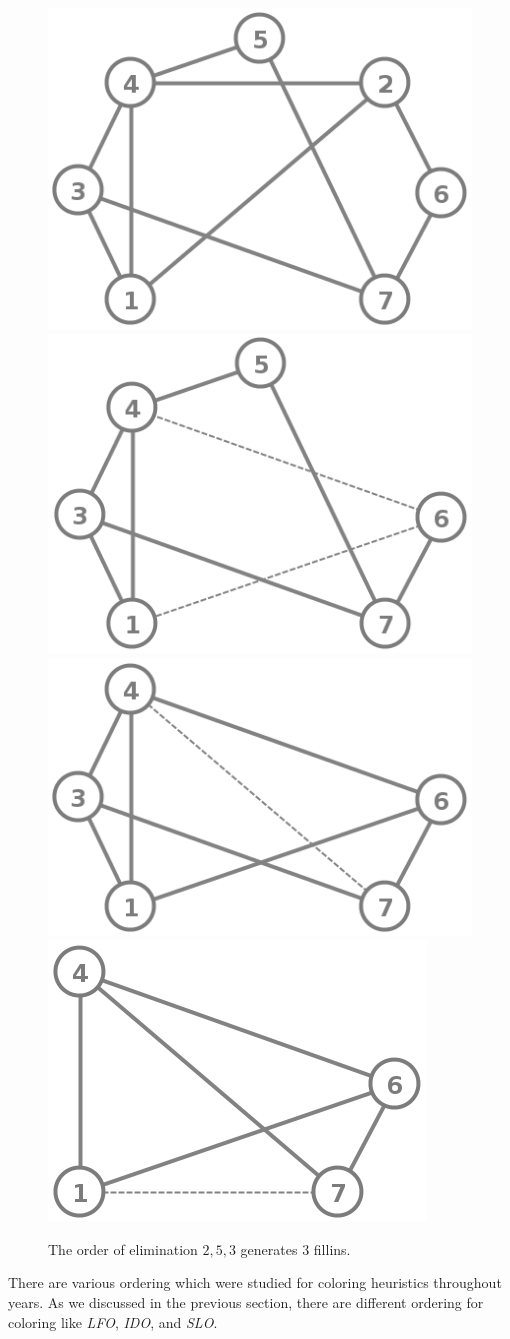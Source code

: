 \documentclass[12pt, oneside]{book}
\begin{document}
\begin{figure}
\centering
   \includegraphics[width=0.4\linewidth]{good_order}
   \hfill
   \includegraphics[width=0.4\linewidth]{good_order_2_removed}
   \includegraphics[width=0.4\linewidth]{good_order_5_2_removed}
   \hfill
   \includegraphics[width=0.25\linewidth]{good_order_3_5_2_removed}
\caption{The order of elimination $2, 5, 3$ generates $3$ fillins.}
\label{good_order_fillin2}
\end{figure}

There are various ordering which were studied for coloring heuristics
throughout years. 
As we discussed in the previous section, there are different ordering for coloring
like \textit{LFO}, \textit{IDO}, and \textit{SLO}.
\end{document}
